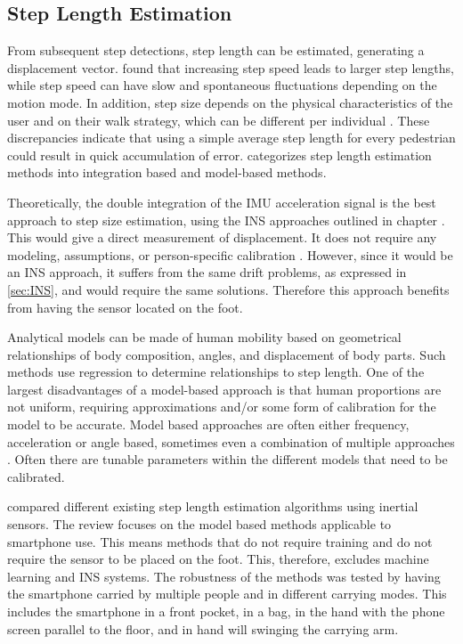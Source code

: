 

\subsection{Step Length Estimation}
\label{sec:step_length_estimation}
From subsequent step detections, step length can be estimated, generating a displacement vector. \citet{Collins2013a} found that increasing step speed leads to larger step lengths, while step speed can have slow and spontaneous fluctuations depending on the motion mode. In addition, step size depends on the physical characteristics of the user and on their walk strategy, which can be different per individual \cite{Diez2018}. These discrepancies indicate that using a simple average step length for every pedestrian could result in quick accumulation of error. \citet{Diez2018} categorizes step length estimation methods into integration based and model-based methods. \par

Theoretically, the double integration of the \ac{IMU} acceleration signal is the best approach to step size estimation, using the INS approaches outlined in chapter . This would give a direct measurement of displacement. It does not require any modeling, assumptions, or person-specific calibration \cite{Diez2018}. However, since it would be an INS approach, it suffers from the same drift problems, as expressed in \cref{sec:INS}, and would require the same solutions. Therefore this approach benefits from having the sensor located on the foot. \par 

Analytical models can be made of human mobility based on geometrical relationships of body composition, angles, and displacement of body parts. Such methods use regression to determine relationships to step length.  One of the largest disadvantages of a model-based approach is that human proportions are not uniform, requiring approximations and/or some form of calibration for the model to be accurate. Model based approaches are often either frequency, acceleration or angle based, sometimes even a combination of multiple approaches \cite{Vezocnik2019}. Often there are tunable parameters within the different models that need to be calibrated.

\citet{Vezocnik2019} compared different existing step length estimation algorithms using inertial sensors. The review focuses on the model based methods applicable to smartphone use. This means methods that do not require training and do not require the sensor to be placed on the foot. This, therefore, excludes machine learning and INS systems. The robustness of the methods was tested by having the smartphone carried by multiple people and in different carrying modes. This includes the smartphone in a front pocket, in a bag, in the hand with the phone screen parallel to the floor, and in hand will swinging the carrying arm. \par 

